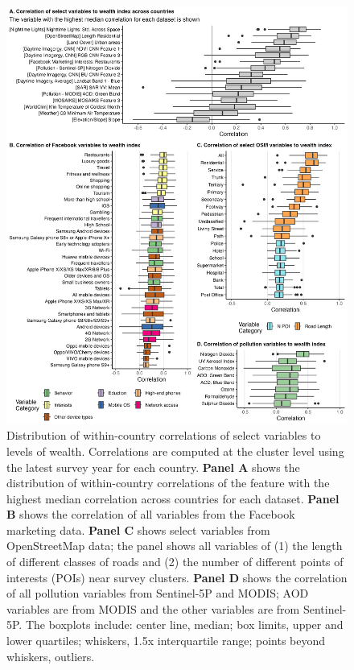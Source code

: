 \documentclass{article}
\begin{document}
\begin{figure}[H]
    \centering
    \includegraphics[width=1\textwidth]{figures/cor_all_fb_osm.png}
    \caption{Distribution of within-country correlations of select variables to levels of wealth. Correlations are computed at the cluster level using the latest survey year for each country. {\bf Panel A} shows the distribution of within-country correlations of the feature with the highest median correlation across countries for each dataset. {\bf Panel B} shows the correlation of all variables from the Facebook marketing data. {\bf Panel C} shows select variables from OpenStreetMap data; the panel shows all variables of (1) the length of different classes of roads and (2) the number of different points of interests (POIs) near survey clusters. {\bf Panel D} shows the correlation of all pollution variables from Sentinel-5P and MODIS; AOD variables are from MODIS and the other variables are from Sentinel-5P. The boxplots include: center line, median; box limits, upper and lower quartiles; whiskers, 1.5x interquartile range; points beyond whiskers, outliers.}
     \label{fig:cor_levels}
\end{figure}
\end{document}

